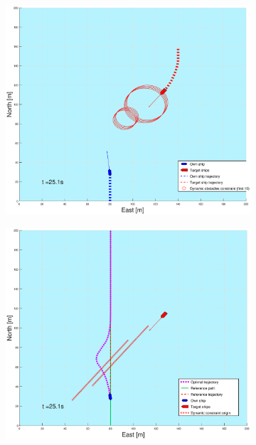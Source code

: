 \begin{figure}[ht!] %
    \begin{subfigure}[b]{0.49\textwidth}
        \centering
        \includegraphics[width=\textwidth]{Images/Figures/sving_GW/_Simple_1fig1_time=25}
    \end{subfigure}
    \hfill
    \begin{subfigure}[b]{0.499\textwidth}
        \centering
        \includegraphics[width=\textwidth]{Images/Figures/sving_GW/_Simple_1fig999_time=25}

\end{subfigure}
\end{figure}
